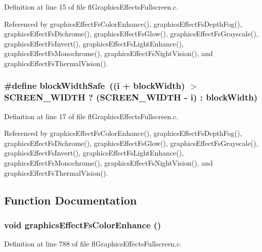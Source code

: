 Definition at line 15 of file fl\-Graphics\-Effects\-Fullscreen.c.

Referenced by graphics\-Effect\-Fs\-Color\-Enhance(), graphics\-Effect\-Fs\-Depth\-Fog(), graphics\-Effect\-Fs\-Dichrome(), graphics\-Effect\-Fs\-Glow(), graphics\-Effect\-Fs\-Grayscale(), graphics\-Effect\-Fs\-Invert(), graphics\-Effect\-Fs\-Light\-Enhance(), graphics\-Effect\-Fs\-Monochrome(), graphics\-Effect\-Fs\-Night\-Vision(), and graphics\-Effect\-Fs\-Thermal\-Vision().
\subsubsection{\setlength{\rightskip}{0pt plus 5cm}\#define block\-Width\-Safe~((i + block\-Width) $>$ SCREEN\_\-WIDTH ? (SCREEN\_\-WIDTH - i) : block\-Width)}\label{flGraphicsEffectsFullscreen_8c_ce63fedcbc10518dd6303516af71bbd9}




Definition at line 17 of file fl\-Graphics\-Effects\-Fullscreen.c.

Referenced by graphics\-Effect\-Fs\-Color\-Enhance(), graphics\-Effect\-Fs\-Depth\-Fog(), graphics\-Effect\-Fs\-Dichrome(), graphics\-Effect\-Fs\-Glow(), graphics\-Effect\-Fs\-Grayscale(), graphics\-Effect\-Fs\-Invert(), graphics\-Effect\-Fs\-Light\-Enhance(), graphics\-Effect\-Fs\-Monochrome(), graphics\-Effect\-Fs\-Night\-Vision(), and graphics\-Effect\-Fs\-Thermal\-Vision().

\subsection{Function Documentation}
\subsubsection{\setlength{\rightskip}{0pt plus 5cm}void graphics\-Effect\-Fs\-Color\-Enhance ()}\label{flGraphicsEffectsFullscreen_8c_ead926c7b04516d1bb97b72c9e0c1365}




Definition at line 788 of file fl\-Graphics\-Effects\-Fullscreen.c.

